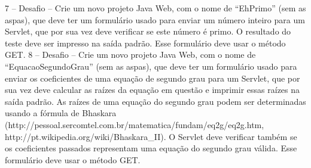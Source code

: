 7 – Desafio – Crie um novo projeto Java Web, com o nome de ``EhPrimo'' (sem as aspas), que deve ter um formulário usado para enviar um número inteiro para um Servlet, que por sua vez deve verificar se este número é primo. O resultado do teste deve ser impresso na saída padrão. Esse formulário deve usar o método GET.
8 – Desafio – Crie um novo projeto Java Web, com o nome de ``EquacaoSegundoGrau'' (sem as aspas), que deve ter um formulário usado para enviar os coeficientes de uma equação de segundo grau para um Servlet, que por sua vez deve calcular as raízes da equação em questão e imprimir essas raízes na saída padrão. As raízes de uma equação do segundo grau podem ser determinadas usando a fórmula de Bhaskara (http://pessoal.sercomtel.com.br/matematica/fundam/eq2g/eq2g.htm, http://pt.wikipedia.org/wiki/Bhaskara\_II). O Servlet deve verificar também se os coeficientes passados representam uma equação do segundo grau válida. Esse formulário deve usar o método GET.